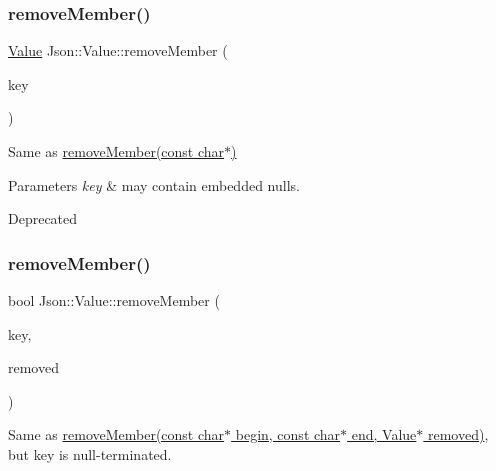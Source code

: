 \subsubsection{\texorpdfstring{remove\+Member()}{removeMember()}\hspace{0.1cm}{\footnotesize\ttfamily [2/10]}}
{\footnotesize\ttfamily \hyperlink{class_json_1_1_value}{Value} Json\+::\+Value\+::remove\+Member (\begin{DoxyParamCaption}\item[{const \hyperlink{config_8h_a1e723f95759de062585bc4a8fd3fa4be}{J\+S\+O\+N\+C\+P\+P\+\_\+\+S\+T\+R\+I\+NG} \&}]{key }\end{DoxyParamCaption})}

Same as \hyperlink{class_json_1_1_value_aa52f7873b95d29627d6e83ba96f69aaa}{remove\+Member(const char$\ast$)} 
\begin{DoxyParams}{Parameters}
{\em key} & may contain embedded nulls. \\
\hline
\end{DoxyParams}
\begin{DoxyRefDesc}{Deprecated}
\item[\hyperlink{deprecated__deprecated000014}{Deprecated}]\end{DoxyRefDesc}
\hypertarget{class_json_1_1_value_a708e599489adf30d65bf85a8ee16e6fb}{}\label{class_json_1_1_value_a708e599489adf30d65bf85a8ee16e6fb} 
\subsubsection{\texorpdfstring{remove\+Member()}{removeMember()}\hspace{0.1cm}{\footnotesize\ttfamily [3/10]}}
{\footnotesize\ttfamily bool Json\+::\+Value\+::remove\+Member (\begin{DoxyParamCaption}\item[{const char $\ast$}]{key,  }\item[{\hyperlink{class_json_1_1_value}{Value} $\ast$}]{removed }\end{DoxyParamCaption})}

Same as \hyperlink{class_json_1_1_value_a49c91af727d6b4eb0af02a81bb2def87}{remove\+Member(const char$\ast$ begin, const char$\ast$ end, Value$\ast$ removed)}, but \textquotesingle{}key\textquotesingle{} is null-\/terminated. \hypertarget{class_json_1_1_value_ae385ecef98427970df525ee876e9f54a}{}\label{class_json_1_1_value_ae385ecef98427970df525ee876e9f54a} 
